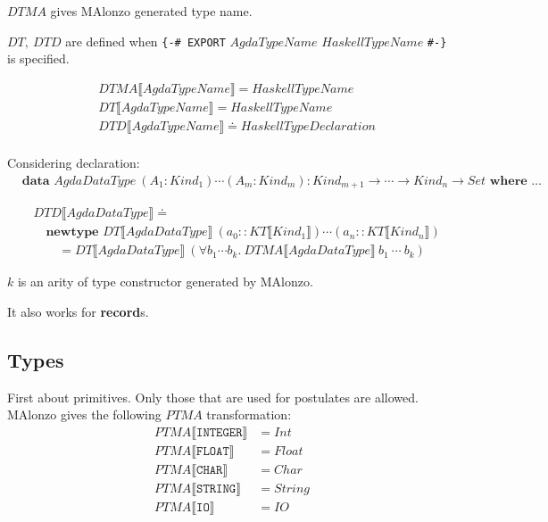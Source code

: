 \(DTMA\) gives MAlonzo generated type name.

\(DT,\ DTD\) are defined when \texttt{\{-\# EXPORT} \(AgdaTypeName\) \(HaskellTypeName\) \texttt{\#-\}} is specified.

\begin{align*}
   &DTMA\llbracket AgdaTypeName \rrbracket = HaskellTypeName\\
   &DT\llbracket AgdaTypeName \rrbracket = HaskellTypeName\\
   &DTD\llbracket AgdaTypeName \rrbracket \doteq HaskellTypeDeclaration\\
\end{align*}

Considering declaration:
\begin{align*}
   &\textbf{data } AgdaDataType\ (A_1 : Kind_1) \cdots (A_m : Kind_m) :
      Kind_{m+1} \rightarrow \cdots \rightarrow Kind_n \rightarrow Set \textbf{ where } \ldots
\end{align*}

\begin{align*}
   &DTD\llbracket AgdaDataType \rrbracket \doteq\\
   &\quad\textbf{newtype } DT\llbracket AgdaDataType \rrbracket\ (a_0 :: KT\llbracket Kind_1 \rrbracket)
      \cdots (a_n :: KT\llbracket Kind_n \rrbracket)\\
   &\quad\quad = DT\llbracket AgdaDataType \rrbracket\ (\forall b_1 \cdots b_k.\ DTMA\llbracket AgdaDataType \rrbracket\ b_1\ \cdots\ b_k)
\end{align*}

\(k\) is an arity of type constructor generated by MAlonzo.

It also works for \textbf{record}s.

\subsection{Types}

First about primitives. Only those that are used for postulates are allowed.
MAlonzo gives the following \(PTMA\) transformation:
\begin{align*}
   PTMA\llbracket \texttt{INTEGER} \rrbracket &= Int\\
   PTMA\llbracket \texttt{FLOAT} \rrbracket &= Float\\
   PTMA\llbracket \texttt{CHAR} \rrbracket &= Char\\
   PTMA\llbracket \texttt{STRING} \rrbracket &= String\\
   PTMA\llbracket \texttt{IO} \rrbracket &= IO
\end{align*}

